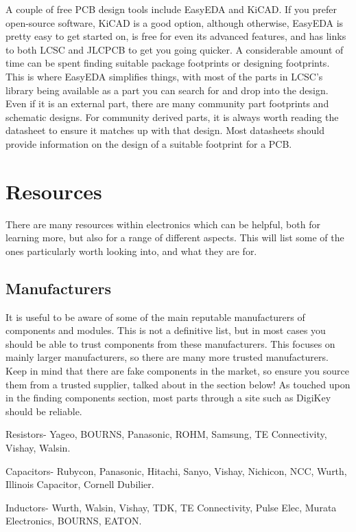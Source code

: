 \documentclass[a4paper,11pt]{report}
\begin{document}
A couple of free PCB design tools include EasyEDA and KiCAD. If you prefer open-source software, KiCAD is a good option, although otherwise, EasyEDA is pretty easy to get started on, is free for even its advanced features, and has links to both LCSC and JLCPCB to get you going quicker. A considerable amount of time can be spent finding suitable package footprints or designing footprints. This is where EasyEDA simplifies things, with most of the parts in LCSC's library being available as a part you can search for and drop into the design. Even if it is an external part, there are many community part footprints and schematic designs. For community derived parts, it is always worth reading the datasheet to ensure it matches up with that design. Most datasheets should provide information on the design of a suitable footprint for a PCB.

\section{Resources}

There are many resources within electronics which can be helpful, both for learning more, but also for a range of different aspects. This will list some of the ones particularly worth looking into, and what they are for.

\subsection{Manufacturers}

It is useful to be aware of some of the main reputable manufacturers of components and modules. This is not a definitive list, but in most cases you should be able to trust components from these manufacturers. This focuses on mainly larger manufacturers, so there are many more trusted manufacturers. Keep in mind that there are fake components in the market, so ensure you source them from a trusted supplier, talked about in the section below! As touched upon in the finding components section, most parts through a site such as DigiKey should be reliable.

Resistors- Yageo, BOURNS, Panasonic, ROHM, Samsung, TE Connectivity, Vishay, Walsin.

Capacitors- Rubycon, Panasonic, Hitachi, Sanyo, Vishay, Nichicon, NCC, Wurth, Illinois Capacitor, Cornell Dubilier.

Inductors- Wurth, Walsin, Vishay, TDK, TE Connectivity, Pulse Elec, Murata Electronics, BOURNS, EATON.
\end{document}
